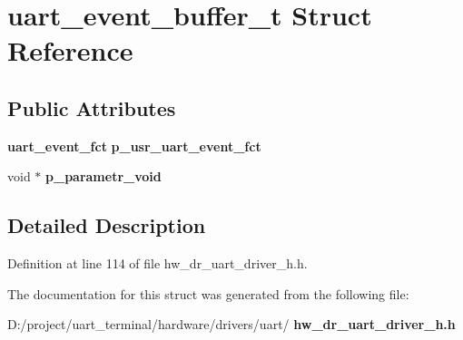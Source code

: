 \section{uart\+\_\+event\+\_\+buffer\+\_\+t Struct Reference}
\label{structuart__event__buffer__t}
\subsection*{Public Attributes}
\begin{DoxyCompactItemize}
\item 
\mbox{\label{structuart__event__buffer__t_a54da75e8c83359b77b8ae09ba7ca184c}} 
\textbf{ uart\+\_\+event\+\_\+fct} {\bfseries p\+\_\+usr\+\_\+uart\+\_\+event\+\_\+fct}
\item 
\mbox{\label{structuart__event__buffer__t_a4f96da5716e41aeea554845553e3758f}} 
void $\ast$ {\bfseries p\+\_\+parametr\+\_\+void}
\end{DoxyCompactItemize}


\subsection{Detailed Description}


Definition at line 114 of file hw\+\_\+dr\+\_\+uart\+\_\+driver\+\_\+h.\+h.



The documentation for this struct was generated from the following file\+:\begin{DoxyCompactItemize}
\item 
D\+:/project/uart\+\_\+terminal/hardware/drivers/uart/\textbf{ hw\+\_\+dr\+\_\+uart\+\_\+driver\+\_\+h.\+h}\end{DoxyCompactItemize}
